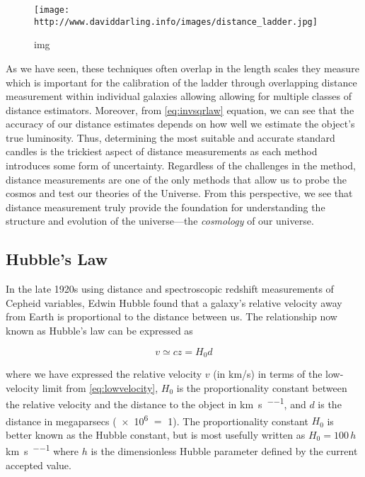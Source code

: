 \begin{figure}
\centering
\texttt{[image: http://www.daviddarling.info/images/distance\_ladder.jpg]}
\caption{img}
\end{figure}

As we have seen, these techniques often overlap in the length scales
they measure which is important for the calibration of the ladder
through overlapping distance measurement within individual galaxies
allowing allowing for multiple classes of distance estimators. Moreover,
from \cref{eq:invsqrlaw} equation, we can see that the
accuracy of our distance estimates depends on how well we estimate the
object's true luminosity. Thus, determining the most suitable and
accurate standard candles is the trickiest aspect of distance
measurements as each method introduces some form of uncertainty.
Regardless of the challenges in the method, distance measurements are
one of the only methods that allow us to probe the cosmos and test our
theories of the Universe. From this perspective, we see that distance
measurement truly provide the foundation for understanding the structure
and evolution of the universe---the \emph{cosmology} of our universe.

\subsection{Hubble's Law}\label{hubbles-law}

In the late 1920s using distance and spectroscopic redshift measurements
of Cepheid variables, Edwin Hubble found that a galaxy's relative
velocity away from Earth is proportional to the distance between us. The
relationship now known as Hubble's law can be expressed as

\begin{equation}v \simeq cz = H_0 d\label{eq:Hubble}\end{equation}

\noindent where we have expressed the relative velocity \(v\) (in
\si{km/s}) in terms of the low-velocity limit from
\cref{eq:lowvelocity}, \(H_0\) is the proportionality
constant between the relative velocity and the distance to the object in
\si{\km\per\s\per\Mpc}, and \(d\) is the distance in megaparsecs
(\SI{e6}{\parsec} \(=\) \SI{1}{\Mpc}). The proportionality constant
\(H_0\) is better known as the Hubble constant, but is most usefully
written as \(H_0= 100\, h\,\)\si{\km\per\s\per\Mpc} where \(h\) is the
dimensionless Hubble parameter defined by the current accepted value.

